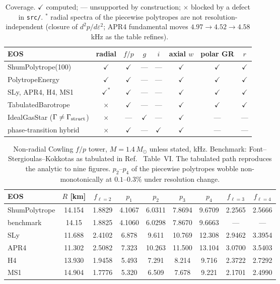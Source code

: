 \documentclass[aps,prd,preprint,amsmath,amssymb,nofootinbib,longbibliography]{revtex4-2}
\newcommand{\Msun}{M_\odot}
\begin{document}
\begin{table}[htbp]
\caption{Coverage. $\checkmark$ computed; --- unsupported by construction; $\times$ blocked by a
defect in \texttt{src/}. $^{*}$ radial spectra of the piecewise polytropes are not
resolution-independent (closure of $d^2p/d\varepsilon^2$; APR4 fundamental moves
$4.97\to4.52\to4.58$~kHz as the table refines).}
\label{tab:coverage}
\begin{ruledtabular}
\begin{tabular}{lccccccc}
EOS & radial & $f/p$ & $g$ & $i$ & axial $w$ & polar GR & $r$ \\
\hline
ShumPolytrope(100)            & $\checkmark$ & $\checkmark$ & --- & --- & $\checkmark$ & $\checkmark$ & $\checkmark$\\
PolytropeEnergy               & $\checkmark$ & $\checkmark$ & --- & --- & $\checkmark$ & $\checkmark$ & $\checkmark$\\
SLy, APR4, H4, MS1            & $\checkmark^{*}$ & $\checkmark$ & --- & --- & $\checkmark$ & $\checkmark$ & $\checkmark$\\
TabulatedBarotrope            & $\times$ & $\checkmark$ & --- & --- & $\checkmark$ & $\checkmark$ & $\checkmark$\\
IdealGasStar ($\Gamma\neq\Gamma_{\rm struct}$) & $\times$ & --- & $\checkmark$ & --- & $\checkmark$ & --- & ---\\
phase-transition hybrid       & $\times$ & $\checkmark$ & --- & $\checkmark$ & $\checkmark$ & --- & ---\\
\end{tabular}
\end{ruledtabular}
\end{table}

\begin{table}[htbp]
\caption{Non-radial Cowling $f/p$ tower, $M = 1.4\,\Msun$ unless stated, kHz. Benchmark:
Font--Stergioulas--Kokkotas as tabulated in Ref.~\cite{Vasquez2021} Table~VI. The tabulated path
reproduces the analytic to nine figures. $p_2$--$p_4$ of the piecewise polytropes wobble
non-monotonically at $0.1$--$0.3\%$ under resolution change.}
\label{tab:fp}
\begin{ruledtabular}
\begin{tabular}{lcccccccc}
EOS & $R$ [km] & $f_{\ell=2}$ & $p_1$ & $p_2$ & $p_3$ & $p_4$ & $f_{\ell=3}$ & $f_{\ell=4}$\\
\hline
ShumPolytrope & 14.154 & 1.8829 & 4.1067 & 6.0311 & 7.8694 & 9.6709 & 2.2565 & 2.5666\\
\quad benchmark & 14.15 & 1.8825 & 4.1060 & 6.0298 & 7.8670 & 9.6663 & --- & ---\\
SLy  & 11.688 & 2.4102 & 6.878 & 9.611 & 10.769 & 12.308 & 2.9462 & 3.3954\\
APR4 & 11.302 & 2.5082 & 7.323 & 10.263 & 11.500 & 13.104 & 3.0700 & 3.5403\\
H4   & 13.930 & 1.9458 & 5.493 & 7.291 & 8.214 & 9.716 & 2.3722 & 2.7292\\
MS1  & 14.904 & 1.7776 & 5.320 & 6.509 & 7.678 & 9.221 & 2.1701 & 2.4990\\
\end{tabular}
\end{ruledtabular}
\end{table}
\end{document}
